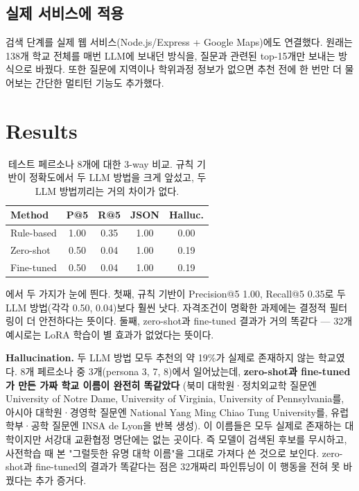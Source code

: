 \documentclass[10pt,twocolumn,letterpaper]{article}
\begin{document}
\subsection{실제 서비스에 적용}
검색 단계를 실제 웹 서비스(Node.js/Express + Google Maps)에도 연결했다. 원래는 138개 학교 전체를 매번 LLM에 보내던 방식을, 질문과 관련된 top-15개만 보내는 방식으로 바꿨다. 또한 질문에 지역이나 학위과정 정보가 없으면 추천 전에 한 번만 더 물어보는 간단한 멀티턴 기능도 추가했다.

\section{Results}
\label{sec:exp}

\begin{table}[t]
\centering
\small
\begin{tabular}{lcccc}
\toprule
Method & P@5 & R@5 & JSON & Halluc. \\
\midrule
Rule-based   & 1.00 & 0.35 & 1.00 & 0.00 \\
Zero-shot    & 0.50 & 0.04 & 1.00 & 0.19 \\
Fine-tuned   & 0.50 & 0.04 & 1.00 & 0.19 \\
\bottomrule
\end{tabular}
\caption{테스트 페르소나 8개에 대한 3-way 비교. 규칙 기반이 정확도에서 두 LLM 방법을
크게 앞섰고, 두 LLM 방법끼리는 거의 차이가 없다.}
\label{tab:main}
\end{table}

에서 두 가지가 눈에 띈다. 첫째, 규칙 기반이
Precision@5 1.00, Recall@5 0.35로 두 LLM 방법(각각 0.50, 0.04)보다 훨씬 낫다. 자격조건이
명확한 과제에는 결정적 필터링이 더 안전하다는 뜻이다. 둘째, zero-shot과 fine-tuned 결과가
거의 똑같다 — 32개 예시로는 LoRA 학습이 별 효과가 없었다는 뜻이다.

\textbf{Hallucination.} 두 LLM 방법 모두 추천의 약 19\%가 실제로 존재하지 않는 학교였다.
8개 페르소나 중 3개(persona 3, 7, 8)에서 일어났는데, \textbf{zero-shot과 fine-tuned가 만든
가짜 학교 이름이 완전히 똑같았다} (북미 대학원·정치외교학 질문엔 University of Notre Dame,
University of Virginia, University of Pennsylvania를, 아시아 대학원·경영학 질문엔 National
Yang Ming Chiao Tung University를, 유럽 학부·공학 질문엔 INSA de Lyon을 반복 생성). 이
이름들은 모두 실제로 존재하는 대학이지만 서강대 교환협정 명단에는 없는 곳이다. 즉 모델이
검색된 후보를 무시하고, 사전학습 때 본 "그럴듯한 유명 대학 이름"을 그대로 가져다 쓴 것으로
보인다. zero-shot과 fine-tuned의 결과가 똑같다는 점은 32개짜리 파인튜닝이 이 행동을 전혀
못 바꿨다는 추가 증거다.
\end{document}
